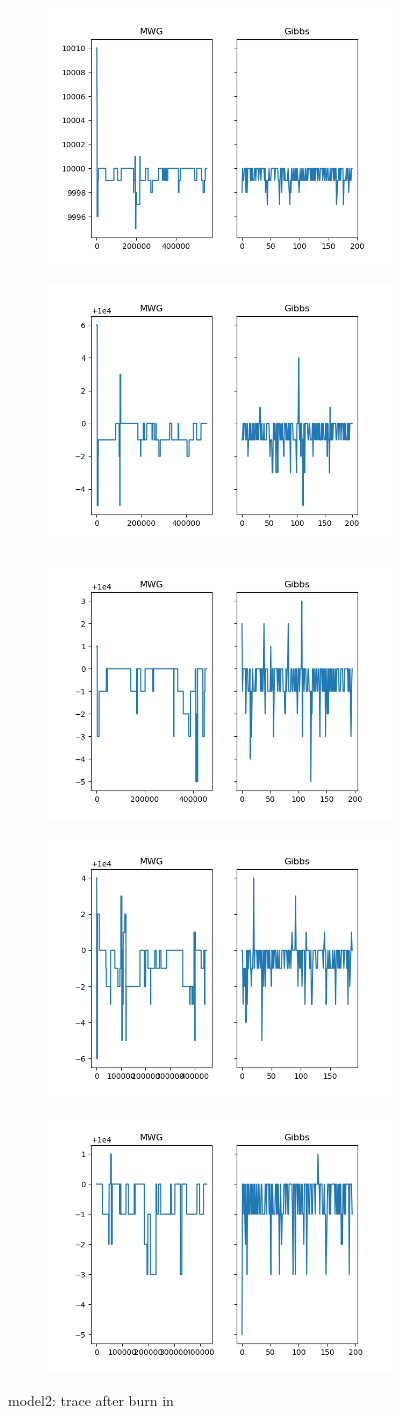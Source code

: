\begin{figure}[H]
    \centering
    \begin{subfigure}
    	\centering
        \includegraphics[width=0.3\linewidth]{../../plots/Trace_post_burnin_M2_N20000_NMCMC3_seed0_diffind2.png}
    \end{subfigure}
    \begin{subfigure}
        \centering
    	\includegraphics[width=0.3\linewidth]{../../plots/Trace_post_burnin_M2_N20000_NMCMC3_seed1_diffind2.png}
	\end{subfigure}
	\begin{subfigure}
	    \centering
    	\includegraphics[width=0.3\linewidth]{../../plots/Trace_post_burnin_M2_N20000_NMCMC3_seed2_diffind2.png}
	\end{subfigure}
	\begin{subfigure}
	    \centering
    	\includegraphics[width=0.3\linewidth]{../../plots/Trace_post_burnin_M2_N20000_NMCMC3_seed3_diffind2.png}
	\end{subfigure}
	\begin{subfigure}
	    \centering
    	\includegraphics[width=0.3\linewidth]{../../plots/Trace_post_burnin_M2_N20000_NMCMC3_seed4_diffind2.png}
	\end{subfigure}
	\caption{model2: trace after burn in}
\end{figure}

